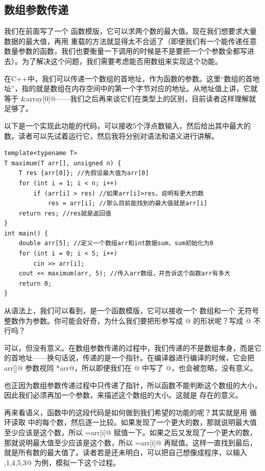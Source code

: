 \subsection*{数组参数传递}
我们在前面写了一个 \lstinline@maximum@ 函数模版，它可以求两个数的最大值。现在我们想要求大量数据的最大值，再用 \lstinline@maximum@ 重载的方法就显得太不合适了（即便我们有一个能传递任意数量参数的函数，我们也要衡量一下调用的时候是不是要把一个个参数全都写进去）。为了解决这个问题，我们需要考虑能否用数组来实现这个功能。\par
在C++中，我们可以传递一个数组的首地址，作为函数的参数。这里``数组的首地址''，指的就是数组在内存空间中的第一个字节对应的地址。从地址值上讲，它就等于 \lstinline@&array[0]@——我们之后再来谈它们在类型上的区别，目前读者这样理解就足够了。\par
以下是一个实现此功能的代码，可以接收5个浮点数输入，然后给出其中最大的数。读者可以先试着运行它，然后我将分别对语法和语义进行讲解。
\begin{lstlisting}
template<typename T>
T maximum(T arr[], unsigned n) {
    T res {arr[0]}; //先假设最大值为arr[0]
    for (int i = 1; i < n; i++)
        if (arr[i] > res) //如果arr[i]>res，说明有更大的数
            res = arr[i]; //那么目前能找到的最大值就是arr[i]
    return res; //res就是返回值
}
int main() {
    double arr[5]; //定义一个数组arr和int数据sum，sum初始化为0
    for (int i = 0; i < 5; i++)
        cin >> arr[i];
    cout << maximum(arr, 5); //传入arr数组，并告诉这个函数arr有多大
    return 0;
}
\end{lstlisting}\par
从语法上，我们可以看到，\lstinline@maximum@ 是一个函数模版，它可以接收一个 \lstinline@arr@ 数组和一个 \lstinline@n@ 无符号整数作为参数。你可能会好奇，为什么我们要把形参写成 \lstinline@arr[]@ 的形状呢？写成 \lstinline@arr[5]@ 不行吗？\par
可以，但没有意义。在数组参数传递的过程中，我们传递的不是数组本身，而是它的首地址——换句话说，传递的是一个指针。在编译器进行编译的时候，它会把 \lstinline@T arr[]@ 参数视同 \lstinline@T *arr@，所以即便我们在 \lstinline@arr[]@ 中写了 @，也会被忽略，没有意义。\par
也正因为数组参数传递过程中只传递了指针，所以函数不能判断这个数组的大小，因此我们必须再加一个参数，来描述这个数组的大小。这就是 \lstinline@n@ 存在的意义。\par
再来看语义，\lstinline@maximum@ 函数中的这段代码是如何做到我们希望的功能的呢？其实就是用 \lstinline@for@ 循环读取 \lstinline@arr@ 中的每个数，然后逐一比较。如果发现了一个更大的数，那就说明最大值至少应该是这个数，所以 \lstinline@ref=arr[i]@ 赋值一下。如果之后又发现了一个更大的数，那就说明最大值至少应该是这个数，所以 \lstinline@ref=arr[i]@ 再赋值。这样一直找到最后，\lstinline@res@ 就是所有数的最大值了。读者若是还未明白，可以把自己想像成程序，以输入 ,1,4,5,3@ 为例，模拟一下这个过程。\par
